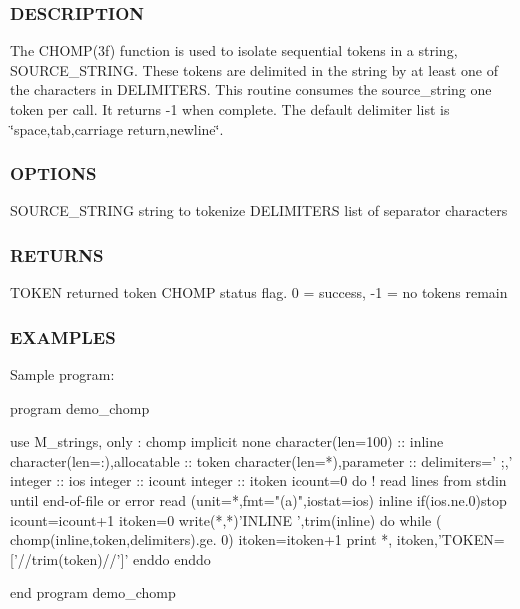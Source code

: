  \subsubsection*{D\+E\+S\+C\+R\+I\+P\+T\+I\+ON}

The C\+H\+O\+M\+P(3f) function is used to isolate sequential tokens in a string, S\+O\+U\+R\+C\+E\+\_\+\+S\+T\+R\+I\+NG. These tokens are delimited in the string by at least one of the characters in D\+E\+L\+I\+M\+I\+T\+E\+RS. This routine consumes the source\+\_\+string one token per call. It returns -\/1 when complete. The default delimiter list is \char`\"{}space,tab,carriage return,newline\char`\"{}.

\subsubsection*{O\+P\+T\+I\+O\+NS}

S\+O\+U\+R\+C\+E\+\_\+\+S\+T\+R\+I\+NG string to tokenize D\+E\+L\+I\+M\+I\+T\+E\+RS list of separator characters

\subsubsection*{R\+E\+T\+U\+R\+NS}

T\+O\+K\+EN returned token C\+H\+O\+MP status flag. 0 = success, -\/1 = no tokens remain

\subsubsection*{E\+X\+A\+M\+P\+L\+ES}

Sample program\+: \begin{DoxyVerb} program demo_chomp

 use M_strings, only : chomp
 implicit none
 character(len=100)            :: inline
 character(len=:),allocatable  :: token
 character(len=*),parameter    :: delimiters=' ;,'
 integer                       :: ios
 integer                       :: icount
 integer                       :: itoken
    icount=0
    do        ! read lines from stdin until end-of-file or error
       read (unit=*,fmt="(a)",iostat=ios) inline
       if(ios.ne.0)stop
       icount=icount+1
       itoken=0
       write(*,*)'INLINE ',trim(inline)
       do while ( chomp(inline,token,delimiters).ge. 0)
          itoken=itoken+1
          print *, itoken,'TOKEN=['//trim(token)//']'
       enddo
    enddo

 end program demo_chomp
\end{DoxyVerb}


